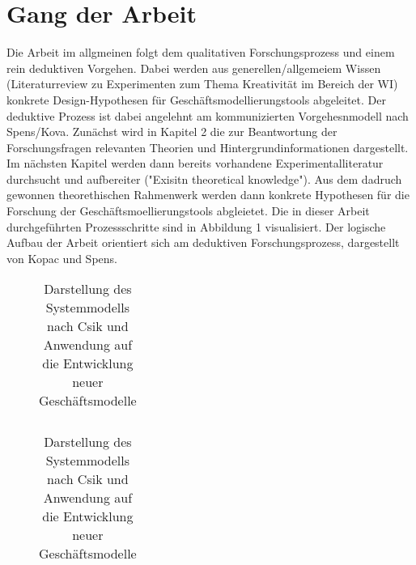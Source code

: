 \section{Gang der Arbeit}
Die Arbeit im allgmeinen folgt dem qualitativen Forschungsprozess und einem rein deduktiven Vorgehen. Dabei werden aus generellen/allgemeiem Wissen (Literaturreview zu Experimenten zum Thema Kreativität im Bereich der WI) konkrete Design-Hypothesen für Geschäftsmodellierungstools abgeleitet. Der deduktive Prozess ist dabei angelehnt am kommunizierten Vorgehesnmodell nach Spens/Kova.
Zunächst wird in Kapitel 2 die zur Beantwortung der Forschungsfragen relevanten Theorien und Hintergrundinformationen dargestellt. Im nächsten Kapitel werden dann bereits vorhandene Experimentalliteratur durchsucht und aufbereiter ("Exisitn theoretical knowledge"). Aus dem dadruch gewonnen theorethischen Rahmenwerk werden dann konkrete Hypothesen für die Forschung der Geschäftsmoellierungstools abgleietet. Die in dieser Arbeit durchgeführten Prozessschritte sind in Abbildung 1 visualisiert. 
Der logische Aufbau der Arbeit orientiert sich am deduktiven Forschungsprozess, dargestellt von Kopac und Spens. 

\noindent
\begin{table}[H]
\centering
\begin{subfigure}[t]{0.45\linewidth}
\begin{tabular}{@{}c@{}}

\end{tabular}
\end{subfigure}
\hfill
\begin{subfigure}[t]{0.45\linewidth}
\begin{tabular}{@{}c@{}}

\end{tabular}
\end{subfigure}
\caption{ Darstellung des Systemmodells nach Csik und Anwendung auf die Entwicklung neuer Geschäftsmodelle}
\end{table}




